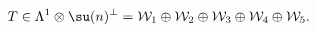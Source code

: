 \begin{equation}
   T \in \Lambda^1 \otimes \su(n)^\perp = 
      \mathcal{W}_1 \oplus \mathcal{W}_2 \oplus \mathcal{W}_3 
         \oplus \mathcal{W}_4 \oplus \mathcal{W}_5 .
\end{equation}


